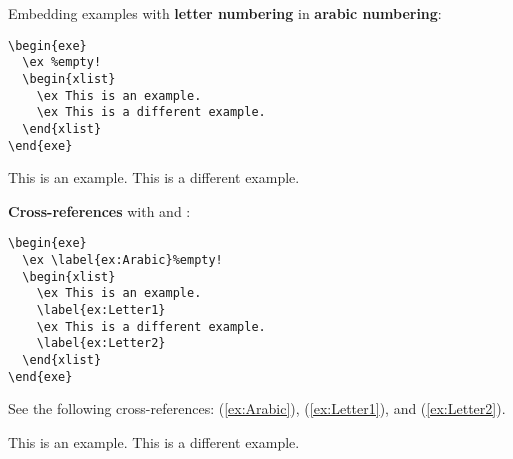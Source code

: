 \begin{frame}[fragile]

Embedding examples with \textbf{letter numbering} in \textbf{arabic numbering}:

\vspace{-.25cm}

\begin{multicols}{2}

\begin{lstlisting}
\begin{exe}
  \ex %empty!
  \begin{xlist}
    \ex This is an example.
    \ex This is a different example. 
  \end{xlist}		
\end{exe}	
\end{lstlisting}

\columnbreak

\begin{exe}
	\ex %
	\begin{xlist}
		\ex This is an example.
		\ex This is a different example. 
	\end{xlist}		
\end{exe}	
\end{multicols}

\textbf{Cross-references} with  and :

\vspace{-.25cm}

\begin{multicols}{2}
	
\begin{lstlisting}
\begin{exe}
  \ex \label{ex:Arabic}%empty!
  \begin{xlist}
    \ex This is an example. 
    \label{ex:Letter1}
    \ex This is a different example. 
    \label{ex:Letter2} 
  \end{xlist}		
\end{exe}	
\end{lstlisting}
	
	\columnbreak

See the following cross-references: (\ref{ex:Arabic}), (\ref{ex:Letter1}), and (\ref{ex:Letter2}).

\vspace{-.1cm}	
\begin{exe}
	\ex \label{ex:Arabic}%
	\begin{xlist}
		\ex This is an example. \label{ex:Letter1}
		\ex This is a different example. \label{ex:Letter2} 
	\end{xlist}		
\end{exe}	

\end{multicols}

\end{frame}


